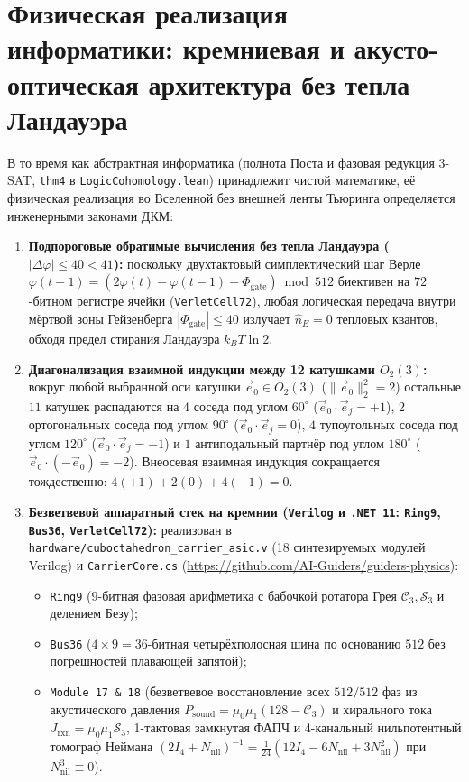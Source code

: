 \documentclass[11pt,a4paper]{article}
\theoremstyle{definition}
\theoremstyle{remark}
\begin{document}
\section{Физическая реализация информатики: кремниевая и акусто-оптическая архитектура без тепла Ландауэра}
\label{sec:silicon-hardware}

В то время как абстрактная информатика (полнота Поста и фазовая редукция 3-SAT, \texttt{thm4} в \texttt{LogicCohomology.lean}) принадлежит чистой математике, её физическая реализация во Вселенной без внешней ленты Тьюринга определяется инженерными законами ДКМ:
\begin{enumerate}[label=\textbf{\arabic*.},leftmargin=*]
\item \textbf{Подпороговые обратимые вычисления без тепла Ландауэра ($|\Delta\varphi|\le 40 < 41$):}
  поскольку двухтактовый симплектический шаг Верле $\varphi(t+1) = (2\varphi(t) - \varphi(t-1) + \Phi_{\mathrm{gate}})\bmod 512$ биективен на $72$-битном регистре ячейки (\texttt{VerletCell72}), любая логическая передача внутри мёртвой зоны Гейзенберга $|\Phi_{\mathrm{gate}}|\le 40$ излучает $\hat{n}_E = 0$ тепловых квантов, обходя предел стирания Ландауэра $k_B T\ln 2$.
\item \textbf{Диагонализация взаимной индукции между 12 катушками $O_2(3)$:}
  вокруг любой выбранной оси катушки $\vec{e}_0\in O_2(3)$ ($\|\vec{e}_0\|_2^2 = 2$) остальные $11$ катушек распадаются на $4$ соседа под углом $60^\circ$ ($\vec{e}_0\cdot\vec{e}_j = +1$), $2$ ортогональных соседа под углом $90^\circ$ ($\vec{e}_0\cdot\vec{e}_j = 0$), $4$ тупоугольных соседа под углом $120^\circ$ ($\vec{e}_0\cdot\vec{e}_j = -1$) и $1$ антиподальный партнёр под углом $180^\circ$ ($\vec{e}_0\cdot(-\vec{e}_0) = -2$). Внеосевая взаимная индукция сокращается тождественно: $4(+1) + 2(0) + 4(-1) = 0$.
\item \textbf{Безветвевой аппаратный стек на кремнии (\texttt{Verilog} и \texttt{.NET~11}: \texttt{Ring9}, \texttt{Bus36}, \texttt{VerletCell72}):}
  реализован в \texttt{hardware/cuboctahedron\_carrier\_asic.v} (18 синтезируемых модулей Verilog) и \texttt{CarrierCore.cs} (\url{https://github.com/AI-Guiders/guiders-physics}):
  \begin{itemize}[noitemsep]
  \item \texttt{Ring9} ($9$-битная фазовая арифметика с бабочкой ротатора Грея $\mathcal{C}_3,\mathcal{S}_3$ и делением Безу);
  \item \texttt{Bus36} ($4\times 9 = 36$-битная четырёхполосная шина по основанию $512$ без погрешностей плавающей запятой);
  \item \texttt{Module~17 \& 18} (безветвевое восстановление всех $512/512$ фаз из акустического давления $P_{\mathrm{sound}} = \mu_0\mu_1(128-\mathcal{C}_3)$ и хирального тока $J_{\mathrm{rxn}} = \mu_0\mu_1\mathcal{S}_3$, 1-тактовая замкнутая ФАПЧ и 4-канальный нильпотентный томограф Неймана $(2I_4 + N_{\mathrm{nil}})^{-1} = \frac{1}{24}(12 I_4 - 6 N_{\mathrm{nil}} + 3 N_{\mathrm{nil}}^2)$ при $N_{\mathrm{nil}}^3 \equiv 0$).
  \end{itemize}
\end{enumerate}
\end{document}
